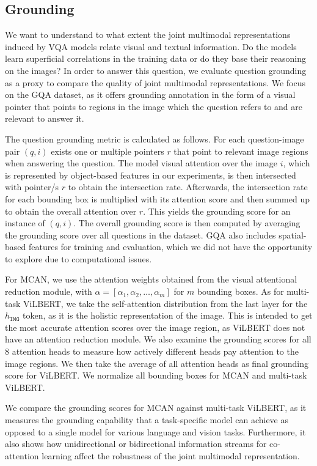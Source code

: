 \documentclass{article}
\begin{document}
\subsection{Grounding}
We want to understand to what extent the joint multimodal representations induced by VQA models relate visual and textual information. Do the models learn superficial correlations in the training data or do they base their reasoning on the images? In order to answer this question, we evaluate question grounding as a proxy to compare the quality of joint multimodal representations. We focus on the GQA dataset, as it offers grounding annotation in the form of a visual pointer that points to regions in the image which the question refers to and are relevant to answer it. 

The question grounding metric is calculated as follows. For each question-image pair $(q, i)$ exists one or multiple pointers $r$ that point to relevant image regions when answering the question. The model visual attention over the image $i$, which is represented by object-based features in our experiments, is then intersected with pointer/s $r$ to obtain the intersection rate. Afterwards, the intersection rate for each bounding box is multiplied with its attention score and then summed up to obtain the overall attention over $r$. This yields the grounding score for an instance of $(q, i)$. The overall grounding score is then computed by averaging the grounding score over all questions in the dataset. GQA also includes spatial-based features for training and evaluation, which we did not have the opportunity to explore due to computational issues.

For MCAN, we use the attention weights obtained from the visual attentional reduction module, with $\alpha = [\alpha_{1}, \alpha_{2}, \dots, \alpha_{m}]$ for $m$ bounding boxes. As for multi-task ViLBERT, we take the self-attention distribution from the last layer for the $h_{\mathtt{IMG}}$ token, as it is the holistic representation of the image. This is intended to get the most accurate attention scores over the image region, as ViLBERT does not have an attention reduction module. We also examine the grounding scores for all 8 attention heads to measure how actively different heads pay attention to the image regions. We then take the average of all attention heads as final grounding score for ViLBERT. We normalize all bounding boxes for MCAN and multi-task ViLBERT.

We compare the grounding scores for MCAN against multi-task ViLBERT, as it measures the grounding capability that a task-specific model can achieve as opposed to a single model for various language and vision tasks. Furthermore, it also shows how unidirectional or bidirectional information streams for co-attention learning affect the robustness of the joint multimodal representation.
\end{document}
